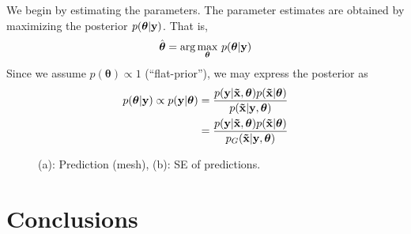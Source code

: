 \documentclass[a4paper,10pt]{article}
\def\by{{\bf y}}
\def\btx{{\bf{\tilde x}}}
\def\btheta{{\boldsymbol \theta}}
\begin{document}
We begin by estimating the parameters. The parameter estimates are obtained by maximizing the posterior $p(\btheta|\by)$. That is,
\begin{equation*}
 \hat \btheta = \arg\max_{\btheta} \, p(\btheta|\by)
\end{equation*}
Since we assume $p(\btheta) \propto 1$ (``flat-prior''), we may express the posterior as
\begin{align*}
 p(\btheta|\by) \propto p(\by|\btheta) &= \frac{p(\by|\btx, \btheta) p(\btx|\btheta)}{p(\btx|\by, \btheta)} \\
 &= \frac{p(\by|\btx, \btheta) p(\btx|\btheta)}{p_G(\btx|\by, \btheta)}
\end{align*}

\begin{figure}[ht]
\centering
  \qquad
  \caption{(a): Prediction (mesh), (b): SE of predictions.}
\label{fig:mesh}
\end{figure}
\section{Conclusions}
\end{document}
